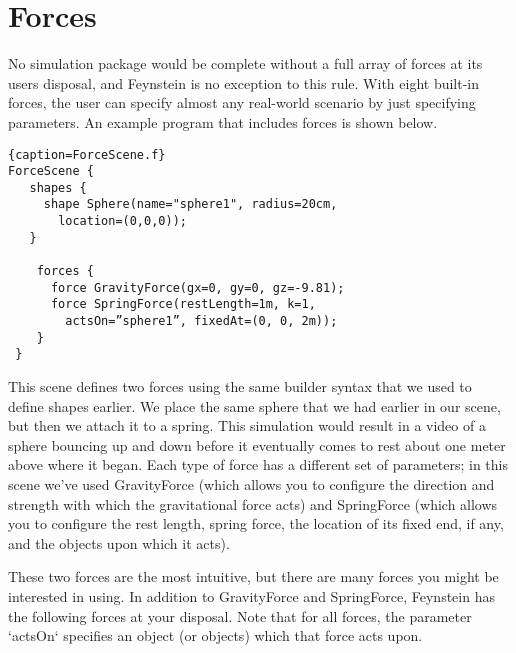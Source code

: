 \documentclass[letterpaper]{article}
\begin{document}
\newpage
\section{Forces}
No simulation package would be complete without a full array of forces
at its users disposal, and Feynstein is no exception to this
rule. With eight built-in forces, the user can specify almost any
real-world scenario by just specifying parameters. An example program
that includes forces is shown below.

\begin{lstlisting}{caption=ForceScene.f}
ForceScene {
   shapes {
     shape Sphere(name="sphere1", radius=20cm, 
       location=(0,0,0));
   }

    forces {
      force GravityForce(gx=0, gy=0, gz=-9.81);
      force SpringForce(restLength=1m, k=1, 
        actsOn=”sphere1”, fixedAt=(0, 0, 2m));
    }
 }
\end{lstlisting}

This scene defines two forces using the same builder syntax that we
used to define shapes earlier. We place the same sphere that we had
earlier in our scene, but then we attach it to a spring. This
simulation would result in a video of a sphere bouncing up and down
before it eventually comes to rest about one meter above where it
began. Each type of force has a different set of parameters; in this
scene we've used GravityForce (which allows you to configure the
direction and strength with which the gravitational force acts) and
SpringForce (which allows you to configure the rest length, spring
force, the location of its fixed end, if any, and the objects upon
which it acts).

These two forces are the most intuitive, but there are many forces you
might be interested in using. In addition to GravityForce and
SpringForce, Feynstein has the following forces at your disposal. Note
that for all forces, the parameter `actsOn` specifies an object (or
objects) which that force acts upon.
\end{document}
